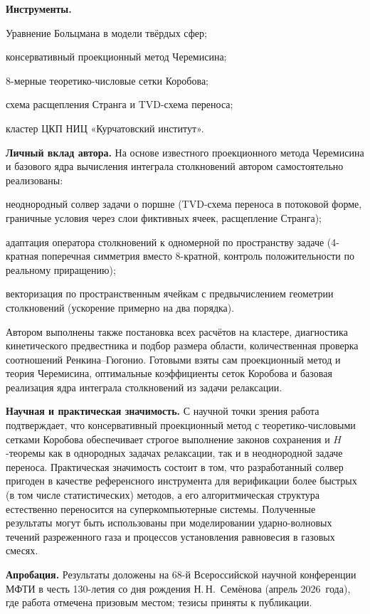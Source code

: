 \documentclass[14pt,a4paper]{extreport}
\numberwithin{equation}{chapter}
\numberwithin{figure}{chapter}
\numberwithin{table}{chapter}
\begin{document}
\textbf{Инструменты.}

Уравнение Больцмана в модели твёрдых сфер;

консервативный проекционный метод Черемисина;

8-мерные теоретико-числовые сетки Коробова;

схема расщепления Странга и TVD-схема переноса;

кластер ЦКП НИЦ «Курчатовский институт».

\textbf{Личный вклад автора.}
На основе известного проекционного метода Черемисина и базового ядра вычисления интеграла столкновений автором
самостоятельно реализованы:

неоднородный солвер задачи о поршне (TVD-схема переноса в потоковой форме, граничные условия через слои фиктивных ячеек,
расщепление Странга);

адаптация оператора столкновений к одномерной по пространству задаче (4-кратная поперечная симметрия вместо 8-кратной,
контроль положительности по реальному приращению);

векторизация по пространственным ячейкам с предвычислением геометрии столкновений (ускорение примерно на два порядка).

Автором выполнены также постановка всех расчётов на кластере, диагностика кинетического предвестника и подбор размера
области, количественная проверка соотношений Ренкина--Гюгонио.
Готовыми взяты сам проекционный метод и теория Черемисина, оптимальные коэффициенты сеток Коробова и базовая реализация
ядра интеграла столкновений из задачи релаксации.

\textbf{Научная и практическая значимость.}
С научной точки зрения работа подтверждает, что консервативный проекционный метод с теоретико-числовыми сетками Коробова
обеспечивает строгое выполнение законов сохранения и $H$-теоремы как в однородных задачах релаксации, так и в
неоднородной задаче переноса.
Практическая значимость состоит в том, что разработанный солвер пригоден в качестве референсного инструмента для
верификации более быстрых (в том числе статистических) методов, а его алгоритмическая структура естественно переносится
на суперкомпьютерные системы.
Полученные результаты могут быть использованы при моделировании ударно-волновых течений разреженного газа и процессов
установления равновесия в газовых смесях.

\textbf{Апробация.}
Результаты доложены на 68-й Всероссийской научной конференции МФТИ в честь 130-летия со дня рождения Н.\,Н.~Семёнова
(апрель 2026~года), где работа отмечена призовым местом; тезисы приняты к публикации.
\end{document}
